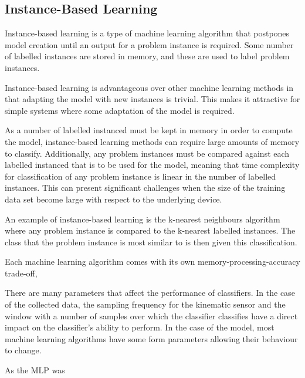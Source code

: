 \subsection{Instance-Based Learning}
Instance-based learning is a type of machine learning algorithm that postpones model creation until an output for a problem instance is required. Some number of labelled instances are stored in memory, and these are used to label problem instances.

Instance-based learning is advantageous over other machine learning methods in that adapting the model with new instances is trivial. This makes it attractive for simple systems where some adaptation of the model is required.

As a number of labelled instanced must be kept in memory in order to compute the model, instance-based learning methods can require large amounts of memory to classify. Additionally, any problem instances must be compared against each labelled instanced that is to be used for the model, meaning that time complexity for classification of any problem instance is linear in the number of labelled instances. This can present significant challenges when the size of the training data set become large with respect to the underlying device.

An example of instance-based learning is the k-nearest neighbours algorithm where any problem instance is compared to the k-nearest labelled instances. The class that the problem instance is most similar to is then given this classification. 

Each machine learning algorithm comes with its own memory-processing-accuracy trade-off, 

There are many parameters that affect the performance of classifiers. In the case of the collected data, the sampling frequency for the kinematic sensor and the window with a number of samples over which the classifier classifies have a direct impact on the classifier's ability to perform. In the case of the model, most machine learning algorithms have some form parameters allowing their behaviour to change. 

As the MLP was 

